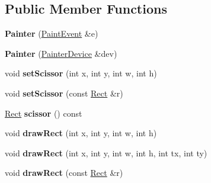 \subsection*{Public Member Functions}
\begin{DoxyCompactItemize}
\item 
\hypertarget{class_tempest_1_1_painter_a5ac9c2c68959ff9e0966ee48031f4d5a}{{\bfseries Painter} (\hyperlink{class_tempest_1_1_paint_event}{Paint\+Event} \&e)}\label{class_tempest_1_1_painter_a5ac9c2c68959ff9e0966ee48031f4d5a}

\item 
\hypertarget{class_tempest_1_1_painter_a650f40471a6037dad7f83e694086e05c}{{\bfseries Painter} (\hyperlink{class_tempest_1_1_painter_device}{Painter\+Device} \&dev)}\label{class_tempest_1_1_painter_a650f40471a6037dad7f83e694086e05c}

\item 
\hypertarget{class_tempest_1_1_painter_a12e15637b695ee77658d4645fa15d6c2}{void {\bfseries set\+Scissor} (int x, int y, int w, int h)}\label{class_tempest_1_1_painter_a12e15637b695ee77658d4645fa15d6c2}

\item 
\hypertarget{class_tempest_1_1_painter_a570dfbe1dcd1673506f609fc9f898cdb}{void {\bfseries set\+Scissor} (const \hyperlink{struct_tempest_1_1_rect}{Rect} \&r)}\label{class_tempest_1_1_painter_a570dfbe1dcd1673506f609fc9f898cdb}

\item 
\hypertarget{class_tempest_1_1_painter_a4003ceafeb3e7a905c887f4fd67851f4}{\hyperlink{struct_tempest_1_1_rect}{Rect} {\bfseries scissor} () const }\label{class_tempest_1_1_painter_a4003ceafeb3e7a905c887f4fd67851f4}

\item 
\hypertarget{class_tempest_1_1_painter_ab90ec6f1e448b335cc628b8b32daa52c}{void {\bfseries draw\+Rect} (int x, int y, int w, int h)}\label{class_tempest_1_1_painter_ab90ec6f1e448b335cc628b8b32daa52c}

\item 
\hypertarget{class_tempest_1_1_painter_aa32e0ea5d050799312d55977641212b9}{void {\bfseries draw\+Rect} (int x, int y, int w, int h, int tx, int ty)}\label{class_tempest_1_1_painter_aa32e0ea5d050799312d55977641212b9}

\item 
\hypertarget{class_tempest_1_1_painter_a3df627146a70a0aec6629e6177ccccfb}{void {\bfseries draw\+Rect} (const \hyperlink{struct_tempest_1_1_rect}{Rect} \&r)}\label{class_tempest_1_1_painter_a3df627146a70a0aec6629e6177ccccfb}


\end{DoxyCompactItemize}
